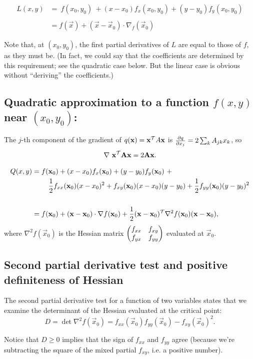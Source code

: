 \begin{align*}
L(x, y) &=
~
f(x_0, y_0) ~+
(x - x_0)f_x(x_0,y_0) +
(y - y_0)f_y(x_0,y_0)
\\\\
&= f(\vec x) + (\vec x - \vec x_0) \cdot \nabla_f(\vec x_0)
\end{align*}

Note that, at $(x_0, y_0)$, the first partial derivatives of $L$ are equal to
those of $f$, as they must be. (In fact, we could say that the coefficients are
determined by this requirement; see the quadratic case below. But the linear
case is obvious without ``deriving'' the coefficients.)


\subsection{Quadratic approximation to a function $f(x, y)$ near $(x_0, y_0)$:}

The $j$-th component of the gradient of $q(\mathbf x) = \mathbf x^\mathcal T A \mathbf x$ is
$\frac{\partial q}{\partial x_j} = 2\sum_k A_{jk}x_k$, so
\begin{align*}
  \nabla ~\mathbf x^\mathcal T \mathbf A \mathbf x = 2\mathbf A \mathbf x.
\end{align*}

\begin{align*}
Q(x, y) &=
f(\mathbf x_0) + (x - x_0)f_x(\mathbf x_0) +
(y - y_0)f_y(\mathbf x_0) ~+ \\
&~~~~~~~\frac{1}{2} f_{xx}(\mathbf x_0)(x - x_0)^2 +
f_{xy}(\mathbf x_0)(x - x_0)(y - y_0) +
\frac{1}{2} f_{yy}(\mathbf x_0)(y - y_0)^2 \\\\
&= f(\mathbf x_0) +
(\mathbf x - \mathbf x_0) \cdot \nabla f(\mathbf x_0) +
\frac{1}{2}(\mathbf x - \mathbf x_0)^\mathcal T \nabla^2 f(\mathbf x_0)(\mathbf x - \mathbf x_0),
\end{align*}
where $\nabla^2 f(\vec x_0)$ is the Hessian matrix $\begin{pmatrix}f_{xx} & f_{xy}\\f_{yx} & f_{yy}\\ \end{pmatrix}$ evaluated at $\vec x_0$.

\subsection{Second partial derivative test and positive definiteness of Hessian}

The second partial derivative test for a function of two variables states that
we examine the determinant of the Hessian evaluated at the critical point:
$$
D = \det \nabla^2 f(\vec x_0) = f_{xx}(\vec x_0)f_{yy}(\vec x_0) - f_{xy}(\vec x_0)^2.
$$

Notice that $D \geq 0$ implies that the sign of $f_{xx}$ and $f_{yy}$ agree
(because we're subtracting the square of the mixed partial $f_{xy}$, i.e. a
positive number).

